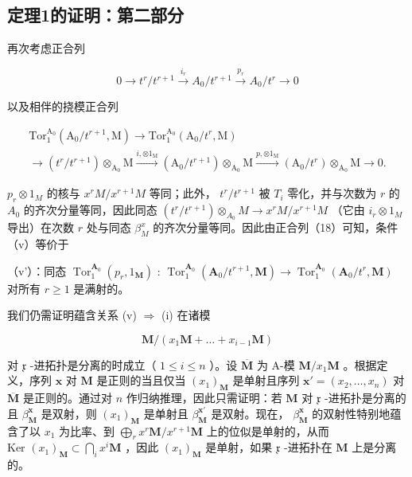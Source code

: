 \subsection{定理1的证明：第二部分}

再次考虑正合列

\[
0 \longrightarrow t ^ {r} / t ^ {r + 1} \xrightarrow {i _ {r}} A _ {0} / t ^ {r + 1} \xrightarrow {p _ {r}} A _ {0} / t ^ {r} \longrightarrow 0\tag{16}
\]

以及相伴的挠模正合列

\[
\begin{array}{l} \text {Tor} _ {1} ^ {\mathrm{A} _ {0}} (\mathrm{A} _ {0} / t ^ {r + 1}, \mathrm{M}) \longrightarrow \mathrm{Tor} _ {1} ^ {\mathrm{A} _ {0}} (\mathrm{A} _ {0} / t ^ {r}, \mathrm{M}) \\ \longrightarrow (t ^ {r} / t ^ {r + 1}) \otimes_ {\mathrm{A} _ {0}} \mathrm{M} \xrightarrow {i , \otimes 1 _ {\mathrm{M}}} (\mathrm{A} _ {0} / t ^ {r + 1}) \otimes_ {\mathrm{A} _ {0}} \mathrm{M} \xrightarrow {p , \otimes 1 _ {\mathrm{M}}} (\mathrm{A} _ {0} / t ^ {r}) \otimes_ {\mathrm{A} _ {0}} \mathrm{M} \longrightarrow 0. \end{array} \tag {18}
\]

\(p_r \otimes 1_M\) 的核与 \(x^r M/x^{r+1} M\) 等同；此外， \(t^r/t^{r+1}\) 被 \(T_i\) 零化，并与次数为 \(r\) 的 \(A_0\) 的齐次分量等同，因此同态 \((t^r/t^{r+1}) \otimes_{A_0} M \to x^r M/x^{r+1} M\) （它由 \(i_r \otimes 1_M\) 导出）在次数 \(r\) 处与同态 \(\beta_M^x\) 的齐次分量等同。因此由正合列（18）可知，条件（v）等价于

（v'）：同态 \(\operatorname{Tor}_{1}^{\mathbf{A}_{0}}(p_{r},1_{\mathbf{M}})\) : \(\operatorname{Tor}_{1}^{\mathbf{A}_{0}}(\mathbf{A}_{0}/t^{r+1},\mathbf{M})\to\operatorname{Tor}_{1}^{\mathbf{A}_{0}}(\mathbf{A}_{0}/t^{r},\mathbf{M})\) 对所有 \(r\geqslant1\) 是满射的。

我们仍需证明蕴含关系 (v) \(\Rightarrow\) (i) 在诸模

\[
\mathbf {M} / (x _ {1} \mathbf {M} + \dots + x _ {i - 1} \mathbf {M})
\]

对 \(\mathfrak{x}\) -进拓扑是分离的时成立（ \(1 \leqslant i \leqslant n\) ）。设 \(\overline{\mathbf{M}}\) 为 A-模 \(\mathbf{M}/x_1 \mathbf{M}\) 。根据定义，序列 \(\mathbf{x}\) 对 \(\mathbf{M}\) 是正则的当且仅当 \((x_1)_\mathbf{M}\) 是单射且序列 \(\mathbf{x}' = (x_2, \ldots, x_n)\) 对 \(\overline{\mathbf{M}}\) 是正则的。通过对 \(n\) 作归纳推理，因此只需证明：若 \(\mathbf{M}\) 对 \(\mathfrak{x}\) -进拓扑是分离的且 \(\beta_{\mathbf{M}}^{\mathbf{x}}\) 是双射，则 \((x_1)_\mathbf{M}\) 是单射且 \(\beta_{\mathbf{M}}^{\mathbf{x}'}\) 是双射。现在， \(\beta_{\mathbf{M}}^{\mathbf{x}}\) 的双射性特别地蕴含了以 \(x_1\) 为比率、到 \(\bigoplus_{r} x^r \mathbf{M}/x^{r+1} \mathbf{M}\) 上的位似是单射的，从而 \(\text{Ker } (x_1)_\mathbf{M} \subset \bigcap_{i} x^i \mathbf{M}\) ，因此 \((x_1)_\mathbf{M}\) 是单射，如果 \(\mathfrak{x}\) -进拓扑在 \(\mathbf{M}\) 上是分离的。

